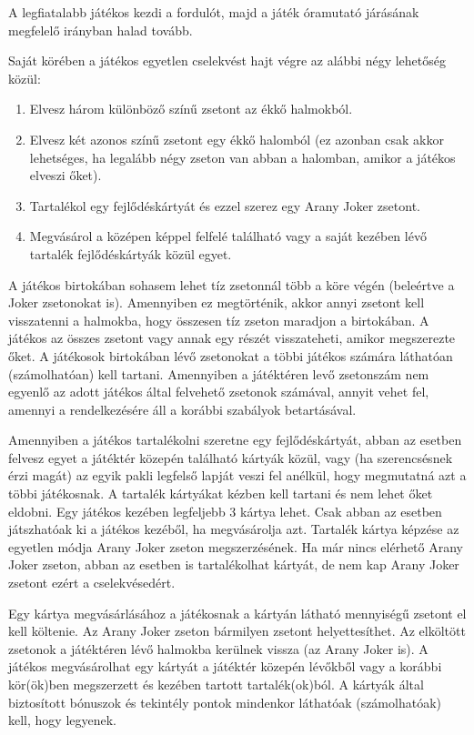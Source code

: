 A legfiatalabb játékos kezdi a fordulót, majd a játék óramutató járásának megfelelő irányban halad tovább.\par 
\vspace{1cm}
Saját körében a játékos egyetlen cselekvést hajt végre az alábbi négy lehetőség közül:
\begin{enumerate}
\item Elvesz három különböző színű zsetont az ékkő halmokból.
\item Elvesz két azonos színű zsetont egy ékkő halomból (ez
azonban csak akkor lehetséges, ha legalább négy zseton van
abban a halomban, amikor a játékos elveszi őket).
\item Tartalékol egy fejlődéskártyát és ezzel szerez egy Arany Joker zsetont.
\item Megvásárol a középen képpel felfelé található vagy a
saját kezében lévő tartalék fejlődéskártyák közül egyet.
\end{enumerate}\par

A játékos birtokában sohasem lehet tíz zsetonnál több a köre végén (beleértve a Joker zsetonokat is). Amennyiben ez megtörténik, akkor annyi zsetont kell visszatenni a halmokba, hogy összesen tíz zseton maradjon a birtokában. A játékos az összes zsetont vagy annak egy részét visszateheti, amikor megszerezte őket. A játékosok birtokában lévő zsetonokat a többi játékos számára láthatóan (számolhatóan) kell tartani. Amennyiben a játéktéren levő zsetonszám nem egyenlő az adott játékos által felvehető zsetonok számával, annyit vehet fel, amennyi a rendelkezésére áll a korábbi szabályok betartásával.

Amennyiben a játékos tartalékolni szeretne egy fejlődéskártyát, abban az esetben felvesz egyet a játéktér közepén található kártyák közül, vagy (ha szerencsésnek érzi magát) az egyik pakli legfelső lapját veszi fel anélkül, hogy megmutatná azt a többi játékosnak. A tartalék kártyákat kézben kell tartani és nem lehet őket eldobni. Egy játékos kezében legfeljebb 3 kártya lehet. Csak abban az esetben játszhatóak ki a játékos kezéből, ha megvásárolja azt. Tartalék kártya képzése az egyetlen módja Arany Joker zseton megszerzésének. Ha már nincs elérhető Arany Joker zseton, abban az esetben is tartalékolhat kártyát, de nem kap Arany Joker zsetont ezért a cselekvésedért.

Egy kártya megvásárlásához a játékosnak a kártyán látható mennyiségű zsetont el kell költenie. Az Arany Joker zseton bármilyen zsetont helyettesíthet. Az elköltött zsetonok a játéktéren lévő halmokba kerülnek vissza (az Arany Joker is). A játékos megvásárolhat egy kártyát a játéktér közepén lévőkből vagy a korábbi kör(ök)ben megszerzett és kezében tartott tartalék(ok)ból. A kártyák által biztosított bónuszok és tekintély pontok mindenkor láthatóak (számolhatóak) kell, hogy legyenek.\par

